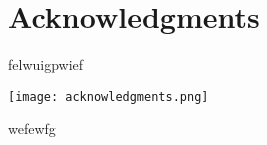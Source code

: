 \section{Acknowledgments}

felwuigpwief

\begin{sidewaysfigure}
  \texttt{[image: acknowledgments.png]}
\end{sidewaysfigure}

wefewfg